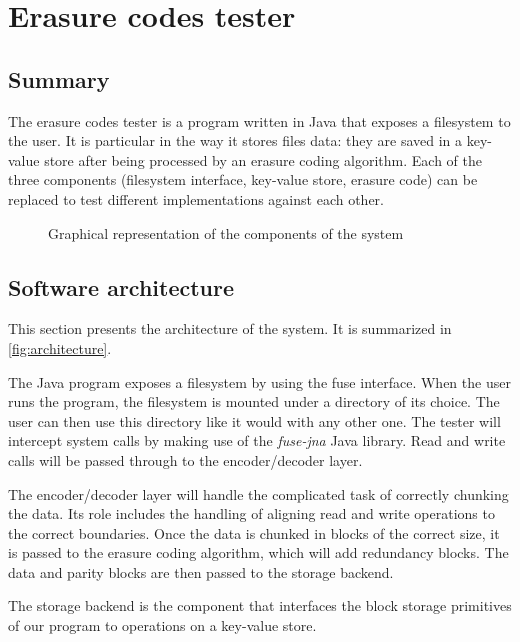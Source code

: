 \chapter{Erasure codes tester}

\section{Summary}

The erasure codes tester is a program written in Java that exposes a filesystem to the user.
It is particular in the way it stores files data: they are saved in a key-value store after being processed by an erasure coding algorithm.
Each of the three components (filesystem interface, key-value store, erasure code) can be replaced to test different implementations against each other.

\begin{figure}
	\centering
	
	\caption{Graphical representation of the components of the system}
	\label{fig:architecture}
\end{figure}

\section{Software architecture}
\label{subsec:architecture}

This section presents the architecture of the system.
It is summarized in \autoref{fig:architecture}.

The Java program exposes a filesystem by using the \ac{fuse} interface.
When the user runs the program, the filesystem is mounted under a directory of its choice.
The user can then use this directory like it would with any other one.
The tester will intercept system calls by making use of the \textit{fuse-jna} \autocite{fuse-jna} Java library.
Read and write calls will be passed through to the encoder/decoder layer.

The encoder/decoder layer will handle the complicated task of correctly chunking the data.
Its role includes the handling of aligning read and write operations to the correct boundaries.
Once the data is chunked in blocks of the correct size, it is passed to the erasure coding algorithm, which will add redundancy blocks.
The data and parity blocks are then passed to the storage backend.

The storage backend is the component that interfaces the block storage primitives of our program to operations on a key-value store.


